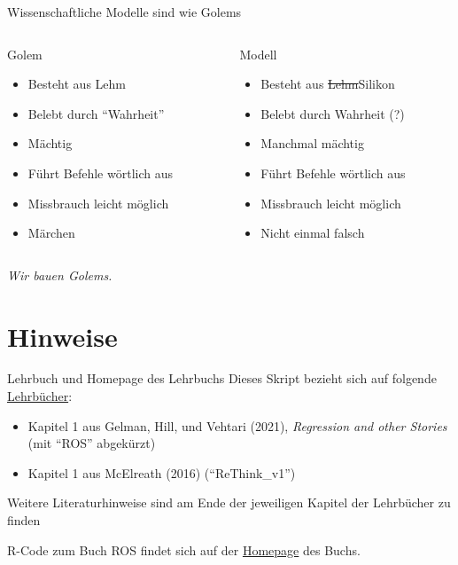 \documentclass[
  ngerman,
  ignorenonframetext,
]{beamer}
\providecommand{\tightlist}{%
  \setlength{\itemsep}{0pt}\setlength{\parskip}{0pt}}
\begin{document}
\begin{frame}{Wissenschaftliche Modelle sind wie Golems}
\protect\hypertarget{wissenschaftliche-modelle-sind-wie-golems}{}
\begin{columns}[T]
\begin{column}{0.5\textwidth}
\begin{block}{Golem}
\protect\hypertarget{golem}{}
\begin{itemize}
\tightlist
\item
  Besteht aus Lehm
\item
  Belebt durch ``Wahrheit''
\item
  Mächtig
\item
  Führt Befehle wörtlich aus
\item
  Missbrauch leicht möglich
\item
  Märchen
\end{itemize}
\end{block}
\end{column}

\begin{column}{0.5\textwidth}
\begin{block}{Modell}
\protect\hypertarget{modell}{}
\begin{itemize}
\tightlist
\item
  Besteht aus \sout{Lehm}Silikon
\item
  Belebt durch Wahrheit (?)
\item
  Manchmal mächtig
\item
  Führt Befehle wörtlich aus
\item
  Missbrauch leicht möglich
\item
  Nicht einmal falsch
\end{itemize}
\end{block}
\end{column}
\end{columns}

\emph{Wir bauen Golems.}
\end{frame}

\hypertarget{hinweise}{%
\section{Hinweise}\label{hinweise}}

\begin{frame}{Lehrbuch und Homepage des Lehrbuchs}
\protect\hypertarget{lehrbuch-und-homepage-des-lehrbuchs}{}
Dieses Skript bezieht sich auf folgende
\protect\hyperlink{literatur}{Lehrbücher}:

\begin{itemize}
\item
  Kapitel 1 aus Gelman, Hill, und Vehtari (2021), \emph{Regression and
  other Stories} (mit ``ROS'' abgekürzt)
\item
  Kapitel 1 aus McElreath (2016) (``ReThink\_v1'')
\end{itemize}

Weitere Literaturhinweise sind am Ende der jeweiligen Kapitel der
Lehrbücher zu finden

R-Code zum Buch ROS findet sich auf der
\href{https://avehtari.github.io/ROS-Examples/examples.html}{Homepage}
des Buchs.
\end{frame}
\end{document}
